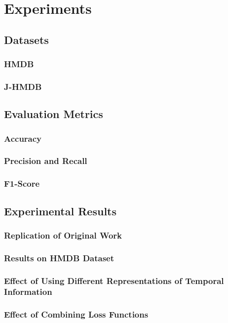 \chapter{Experiments}

\section{Datasets}
\subsection{HMDB}

\subsection{J-HMDB}


\section{Evaluation Metrics}
\subsection{Accuracy}

\subsection{Precision and Recall}

\subsection{F1-Score}


\section{Experimental Results}
\subsection{Replication of Original Work}

\subsection{Results on HMDB Dataset}

\subsection{Effect of Using Different Representations of Temporal Information}

\subsection{Effect of Combining Loss Functions}